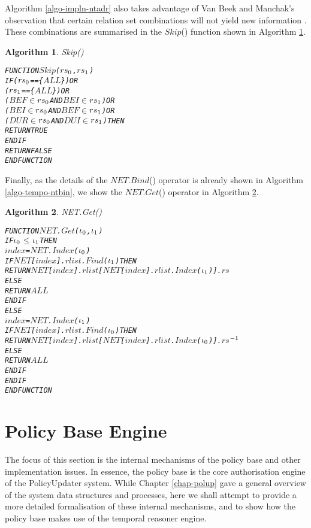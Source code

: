 \documentclass[11pt]{report}
\newenvironment{vverbatim}
{
  \begin{alltt}
}
{
    \vspace{-\baselineskip}
  \end{alltt}
}
\newtheorem{vvalgorithm}{Algorithm}[chapter]
\newenvironment{valgorithm}[2]
{
  \begin{vvalgorithm}{#1}
    \label{#2}
    \small
    \begin{vverbatim}
}
{
    \end{vverbatim}
  \end{vvalgorithm}
}
\begin{document}
        Algorithm \ref{algo-impln-ntadr} also takes advantage of Van Beek and
        Manchak's observation that certain relation set combinations will not
        yield new information \cite{VAN2}. These combinations are summarised in
        the $Skip$() function shown in Algorithm \ref{algo-impln-skipp}.

        \begin{valgorithm}{Skip()}{algo-impln-skipp}
FUNCTION \(Skip\)(\(rs\sb{0}\), \(rs\sb{1}\))
  IF (\(rs\sb{0}\) == \{\(ALL\)\}) OR
     (\(rs\sb{1}\) == \{\(ALL\)\}) OR
     (\(BEF\) \(\in\) \(rs\sb{0}\) AND \(BEI\) \(\in\) \(rs\sb{1}\)) OR
     (\(BEI\) \(\in\) \(rs\sb{0}\) AND \(BEF\) \(\in\) \(rs\sb{1}\)) OR
     (\(DUR\) \(\in\) \(rs\sb{0}\) AND \(DUI\) \(\in\) \(rs\sb{1}\)) THEN
    RETURN TRUE
  ENDIF
  RETURN FALSE
ENDFUNCTION
        \end{valgorithm}

        Finally, as the details of the $NET$.$Bind$() operator is already shown
        in Algorithm \ref{algo-tempo-ntbin}, we show the $NET$.$Get$() operator
        in Algorithm \ref{algo-impln-ntget}.

        \begin{valgorithm}{NET.Get()}{algo-impln-ntget}
FUNCTION \(NET\).\(Get\)(\(\iota\sb{0}\), \(\iota\sb{1}\))
  IF \(\iota\sb{0}\) \(\leq\) \(\iota\sb{1}\) THEN
    \(index\) = \(NET\).\(Index\)(\(\iota\sb{0}\))
    IF \(NET\)[\(index\)].\(rlist\).\(Find\)(\(\iota\sb{1}\)) THEN
      RETURN \(NET\)[\(index\)].\(rlist\)[\(NET\)[\(index\)].\(rlist\).\(Index\)(\(\iota\sb{1}\))].\(rs\)
    ELSE
      RETURN \(ALL\)
    ENDIF
  ELSE
    \(index\) = \(NET\).\(Index\)(\(\iota\sb{1}\))
    IF \(NET\)[\(index\)].\(rlist\).\(Find\)(\(\iota\sb{0}\)) THEN
      RETURN \(NET\)[\(index\)].\(rlist\)[\(NET\)[\(index\)].\(rlist\).\(Index\)(\(\iota\sb{0}\))].\(rs\)\(\sp{-1}\)
    ELSE
      RETURN \(ALL\)
    ENDIF
  ENDIF
ENDFUNCTION
        \end{valgorithm}

    \section{Policy Base Engine}
      \label{sect-impln-polba}

      The focus of this section is the internal mechanisms of the policy base
      and other implementation issues. In essence, the policy base is the
      core authorisation engine of the PolicyUpdater system. While Chapter
      \ref{chap-polup} gave a general overview of the system data structures
      and processes, here we shall attempt to provide a more detailed
      formalisation of these internal mechanisms, and to show how the policy
      base makes use of the temporal reasoner engine.
\end{document}
